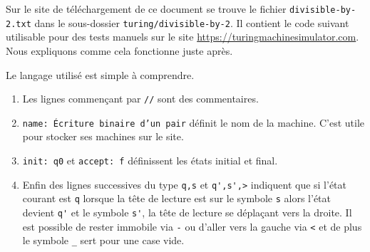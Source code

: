 Sur le site de téléchargement de ce document se trouve le fichier \verb+divisible-by-2.txt+ dans le sous-dossier \verb+turing/divisible-by-2+.
Il contient le code suivant utilisable pour des tests manuels sur le site \url{https://turingmachinesimulator.com}. Nous expliquons comme cela fonctionne juste après.


Le langage utilisé est simple à comprendre.
\begin{enumerate}
	\item Les lignes commençant par \verb+//+ sont des commentaires.

	\item \verb+name: Écriture binaire d’un pair+ définit le nom de la machine. C'est utile pour stocker ses machines sur le site.
	
	\item \verb+init: q0+ et \verb+accept: f+ définissent les états initial et final.
	
	\item Enfin des lignes successives du type \verb+q,s+ et \verb+q',s',>+ indiquent que si l'état courant est \verb+q+ lorsque la tête de lecture est sur le symbole \verb+s+ alors l'état devient \verb+q'+ et le symbole \verb+s'+, la tête de lecture se déplaçant vers la droite.
	Il est possible de rester immobile via \verb+-+ ou d'aller vers la gauche via \verb+<+ et de plus le symbole \verb+_+ sert pour une case vide.
\end{enumerate}
